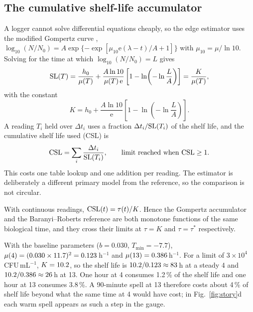\subsection{The cumulative shelf-life accumulator}
A logger cannot solve differential equations cheaply, so the edge estimator uses the modified Gompertz curve \cite{zwietering1990}, $\log_{10}(N/N_0)=A\exp\{-\exp[\mu_{10}\mathrm{e}(\lambda-t)/A+1]\}$ with $\mu_{10}=\mu/\ln10$. Solving for the time at which $\log_{10}(N/N_0)=L$ gives
\begin{equation}\label{eq:sl}
\mathrm{SL}(T) = \frac{h_0}{\mu(T)} + \frac{A\ln10}{\mu(T)\,\mathrm{e}}\left[1-\ln\!\left(-\ln\frac{L}{A}\right)\right]=\frac{K}{\mu(T)},
\end{equation}
with the constant
\begin{equation}\label{eq:K}
K = h_0 + \frac{A\ln 10}{\mathrm{e}}\left[1-\ln\!\left(-\ln\frac{L}{A}\right)\right].
\end{equation}
A reading $T_i$ held over $\Delta t_i$ uses a fraction $\Delta t_i/\mathrm{SL}(T_i)$ of the shelf life, and the cumulative shelf life used (CSL) is
\begin{equation}\label{eq:csl}
\mathrm{CSL} = \sum_i \frac{\Delta t_i}{\mathrm{SL}(T_i)}, \qquad \text{limit reached when } \mathrm{CSL}\ge 1.
\end{equation}
This costs one table lookup and one addition per reading. The estimator is deliberately a different primary model from the reference, so the comparison is not circular.

\begin{proposition}\label{prop:csl}
With continuous readings, $\mathrm{CSL}(t)=\tau(t)/K$. Hence the Gompertz accumulator and the Baranyi--Roberts reference are both monotone functions of the same biological time, and they cross their limits at $\tau=K$ and $\tau=\tau^*$ respectively.
\end{proposition}


\begin{worked}
With the baseline parameters ($b=0.030$, $T_{\min}=-7.7$\degC), $\mu(4)=(0.030\times11.7)^2=0.123$\,h$^{-1}$ and $\mu(13)=0.386$\,h$^{-1}$. For a limit of $3\times10^4$\,CFU\,mL$^{-1}$, $K=10.2$, so the shelf life is $10.2/0.123\approx83$\,h at a steady 4\degC{} and $10.2/0.386\approx26$\,h at 13\degC. One hour at 4\degC{} consumes 1.2\,\% of the shelf life and one hour at 13\degC{} consumes 3.8\,\%. A 90-minute spell at 13\degC{} therefore costs about 4\,\% of shelf life beyond what the same time at 4\degC{} would have cost; in Fig.~\ref{fig:story}d each warm spell appears as such a step in the gauge.
\end{worked}

